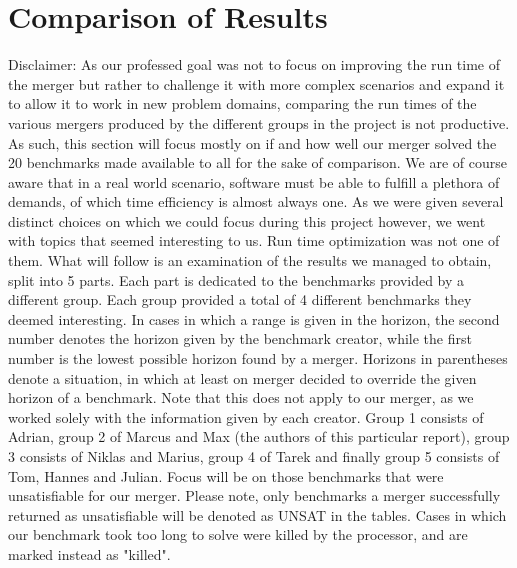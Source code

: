 \documentclass{llncs}
\begin{document}
\newpage


\section{Comparison of Results}
Disclaimer: As our professed goal was not to focus on improving the run time of the merger but rather to challenge it with more complex scenarios and expand it to allow it to work in new problem domains, comparing the run times of the various mergers produced by the different groups in the project is not productive. As such, this section will focus mostly on if and how well our merger solved the 20 benchmarks made available to all for the sake of comparison.\newline
We are of course aware that in a real world scenario, software must be able to fulfill a plethora of demands, of which time efficiency is almost always one. As we were given several distinct choices on which we could focus during this project however, we went with topics that seemed interesting to us. Run time optimization was not one of them.\newline\newline
What will follow is an examination of the results we managed to obtain, split into 5 parts. Each part is dedicated to the benchmarks provided by a different group. Each group provided a total of 4 different benchmarks they deemed interesting. In cases in which a range is given in the horizon, the second number denotes the horizon given by the benchmark creator, while the first number is the lowest possible horizon found by a merger. Horizons in parentheses denote a situation, in which at least on merger decided to override the given horizon of a benchmark. Note that this does not apply to our merger, as we worked solely with the information given by each creator.\newline
Group 1 consists of Adrian, group 2 of Marcus and Max (the authors of this particular report), group 3 consists of Niklas and Marius, group 4 of Tarek and finally group 5 consists of Tom, Hannes and Julian.\newline
Focus will be on those benchmarks that were unsatisfiable for our merger. Please note, only benchmarks a merger successfully returned as unsatisfiable will be denoted as UNSAT in the tables. Cases in which our benchmark took too long to solve were killed by the processor, and are marked instead as "killed".
\end{document}
